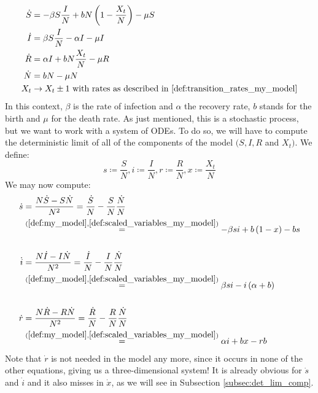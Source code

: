 \documentclass[12pt,a4paper,twoside]{article}
\begin{document}
\begin{align}\label{def:stoch_process_my_model}
\begin{split}
\dot{S} &= -\beta S\frac{I}{N} + bN\left(1-\frac{X_t}{N}\right) - \mu S\\
\dot{I} &= \beta S\frac{I}{N}  - \alpha I - \mu I\\
\dot{R} &= \alpha I + bN\frac{X_t}{N} - \mu R\\
\dot{N} &= bN - \mu N\\
X_t &\rightarrow X_t \pm 1\textnormal{ with rates as described in \eqref{def:transition_rates_my_model}}
\end{split}
\end{align}
In this context, $\beta$ is the rate of infection and $\alpha$ the recovery rate, $b$ stands for the birth and $\mu$ for the death rate. As just mentioned, this is a stochastic process, but we want to work with a system of \acp{ODE}. To do so, we will have to compute the deterministic limit of all of the components of the model $(S,I, R$ and $X_t)$. We define:
\begin{equation}\label{def:scaled_variables_my_model}
s\coloneqq \frac{S}{N}, i\coloneqq \frac{I}{N}, r\coloneqq \frac{R}{N}, x\coloneqq \frac{X_t}{N}
\end{equation}
We may now compute:
\begin{align*}
\dot{s} &= \frac{N\dot{S}-S\dot{N}}{N^2} = \frac{\dot{S}}{N} - \frac{S}{N}\frac{\dot{N}}{N}\\
&\overset{(\ref{def:my_model}, \ref{def:scaled_variables_my_model})}{=} -\beta si + b\left(1-x\right) - bs\\
&\\
\dot{i} &= \frac{N\dot{I}-I\dot{N}}{N^2} = \frac{\dot{I}}{N} - \frac{I}{N}\frac{\dot{N}}{N}\\
&\overset{(\ref{def:my_model}, \ref{def:scaled_variables_my_model})}{=} \beta si - i\left(\alpha + b\right)\\
&\\
\dot{r} &= \frac{N\dot{R}-R\dot{N}}{N^2} = \frac{\dot{R}}{N} - \frac{R}{N}\frac{\dot{N}}{N}\\
&\overset{(\ref{def:my_model}, \ref{def:scaled_variables_my_model})}{=} \alpha i + bx - rb
\end{align*}
Note that $\dot{r}$ is not needed in the model any more, since it occurs in none of the other equations, giving us a three-dimensional system! It is already obvious for $\dot{s}$ and $\dot{i}$ and it also misses in $\dot{x}$, as we will see in Subsection \ref{subsec:det_lim_comp}. 
\end{document}
